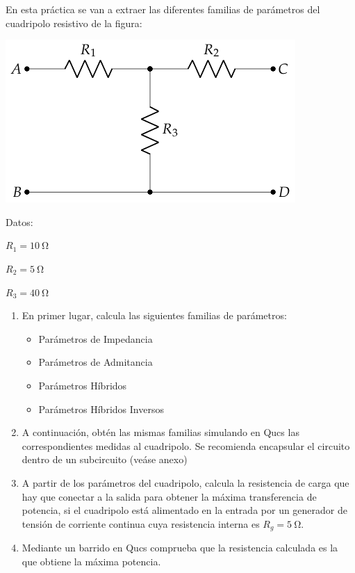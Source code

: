 \documentclass[a4paper,10pt]{article} %
\begin{document}

\vspace{1cm}

En esta práctica se van a extraer las diferentes familias de parámetros del cuadripolo resistivo de la figura:

\begin{minipage}{0.7\linewidth}
  \begin{center}
    \includegraphics{../figs/circuito_P5}
  \end{center}
\end{minipage}
\begin{minipage}{0.3\linewidth}
  Datos:

  $R_1 = \qty{10}{\ohm}$

  $R_2 = \qty{5}{\ohm}$

  $R_3 = \qty{40}{\ohm}$

\end{minipage}

\begin{enumerate}
\item En primer lugar, calcula las siguientes familias de parámetros:
  \begin{itemize}
  \item Parámetros de Impedancia
  \item Parámetros de Admitancia
  \item Parámetros Híbridos
  \item Parámetros Híbridos Inversos
  \end{itemize}
\item A continuación, obtén las mismas familias simulando en Qucs las correspondientes medidas al cuadripolo. Se recomienda encapsular el circuito dentro de un subcircuito (veáse anexo)
\item A partir de los parámetros del cuadripolo, calcula la resistencia de carga que hay que conectar a la salida para obtener la máxima transferencia de potencia, si el cuadripolo está alimentado en la entrada por un generador de tensión de corriente continua cuya resistencia interna es $R_g = \qty{5}{\ohm}$.
\item Mediante un barrido en Qucs comprueba que la resistencia calculada es la que obtiene la máxima potencia.
\end{enumerate}
\end{document}
